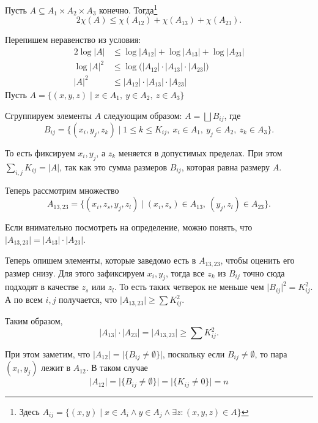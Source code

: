 \begin{lm}
	Пусть $ A \subseteq A_1 \times A_2 \times A_3$ конечно.
	Тогда\footnote{Здесь $ A_{ij} = \{(x, y) \mid x \in A_i \land y \in  A_j \land \exists z\colon  (x, y, z) \in A \}$}
	\[
		2 \chi(A) \le \chi(A_{12}) + \chi(A_{13}) + \chi(A_{23})
	.\] 
\end{lm}
\begin{proof*}
	Перепишем неравенство из условия:
	\begin{align*}
		2 \log \lvert A \rvert &\le \log \lvert A_{12} \rvert  + \log  \lvert A_{13} \rvert  + \log \lvert A_{23} \rvert  \\
		\log \lvert A \rvert^2 & \le \log \bigl(\lvert A_{12} \rvert \cdot \lvert A_{13} \rvert \cdot \lvert A_{23} \rvert\bigr)   \\
		\lvert A \rvert ^2 &\le \lvert A_{12} \rvert \cdot \lvert A_{13} \rvert \cdot \lvert A_{23} \rvert \tag{$ \log$  --- возрастающая функция}  
	\end{align*}
	Пусть $ A = \{(x, y, z) \mid x \in A_1 , ~ y \in A_2 , ~ z \in A_3\}$

	Сгруппируем элементы $ A$ следующим образом: $ A = \bigsqcup B_{ij}$, где 
	$$ B_{ij} = \{(x_i, y_j, z_k) \mid 1 \le k \le K_{ij} , ~ x_i \in A_1 , ~ y_j \in  A_2 , ~ z_k \in A_3\}.$$

	То есть фиксируем $ x_i, y_j$, а $ z_k$ меняется в допустимых пределах. 
	При этом $ \sum_{i, j} K_{ij} = \lvert A \rvert $, так как это сумма размеров $ B_{ij}$, которая равна размеру $ A$. 
	
	Теперь рассмотрим множество 
	\[
		A_{13, 23} = \{(x_i, z_s, y_j, z_l) \mid (x_i, z_s) \in A_{13}, ~ (y_j, z_l)  \in A_{23}\}
	.\] 

	Если внимательно посмотреть на определение, можно понять, что $ \lvert A_{13, 23} \rvert = \lvert A_{13} \rvert \cdot \lvert A_{23} \rvert $.

	Теперь опишем элементы, которые заведомо есть в $ A_{13, 23}$, чтобы оценить его размер снизу.
	Для этого зафиксируем $ x_i, y_j$, тогда все $ z_k$ из $ B_{ij}$ точно сюда подходят в качестве $ z_s$ или $ z_l$.
	То есть таких четверок не меньше чем $ \lvert B_{ij}\rvert^2 = K_{ij}^2$. 
	А по всем $ i, j$ получается, что $ \lvert A_{13,23}  \rvert \ge \sum K_{ij}^2$.

	Таким образом,
	\[
		\lvert A_{13} \rvert 	\cdot  \lvert A_{23} \rvert  = \lvert A_{13,23} \rvert \ge \sum K_{ij}^2 
	.\] 
    
    При этом заметим, что 
    $\lvert A_{12} \rvert = \lvert\{B_{ij} \neq \emptyset \}\rvert$, поскольку если $B_{ij} \neq \emptyset$, то пара $(x_i, y_j)$ лежит в $A_{12}$. В таком случае 
    $$\lvert A_{12} \rvert = \lvert \{ B_{ij} \neq \emptyset \} \rvert = \lvert \{ K_{ij} \neq 0 \} \rvert = n$$
    

\end{proof*}

